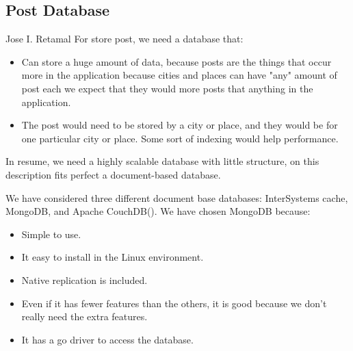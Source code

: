 \subsection{Post Database}
Jose I. Retamal
\vskip 0.1in
\indent
\indent
For store post, we need a database that:
\begin{itemize}
	\item Can store a huge amount of data, because posts are the things that occur more in the application because cities and places can have "any" amount of post each we expect that they would more posts that anything in the application. 
	
	\item The post would need to be stored by a city or place, and they would be for one particular city or place. Some sort of indexing would help performance.


\end{itemize}

	In resume, we need a highly scalable database with little structure, on this description fits perfect a document-based database.

We have considered three different document base databases: InterSystems cache, MongoDB, and Apache CouchDB(). We have  chosen MongoDB because:

\begin{itemize}
	\item Simple to use.
	\item It easy to install in the Linux environment.
	\item Native replication is included.
	\item Even if it has fewer features than the others, it is good because we don't really need the extra features.
	\item It has a go driver to access the database. 
\end{itemize}
